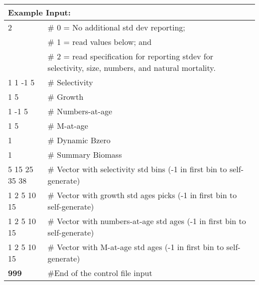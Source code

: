 \begin{longtable}{p{1.1cm} p{1.4cm} p{1.2cm} p{1.2cm} p{1.3cm} p{1.6cm} p{1.4cm} p{1.4cm} p{1.4cm}}
	
	\hline
	\multicolumn{9}{l}{Example Input:} \Tstrut\Bstrut\\
	\hline
	
	\multicolumn{3}{l}{2} & \multicolumn{6}{l}{\# 0 = No additional std dev reporting;} \Tstrut\\
	\multicolumn{3}{l}{ } & \multicolumn{6}{l}{\# 1 = read values below; and} \Bstrut\\
	\multicolumn{3}{l}{ } & \multicolumn{6}{l}{\# 2 = read specification for reporting stdev for selectivity, size, numbers, and natural mortality.} \Bstrut\\
	\hline
	
	\multicolumn{4}{l}{1 1 -1 5}  & \multicolumn{5}{l}{\# Selectivity} \Bstrut\\
	\multicolumn{4}{l}{1 5}       & \multicolumn{5}{l}{\# Growth} \Bstrut\\
	\multicolumn{4}{l}{1 -1 5}    & \multicolumn{5}{l}{\# Numbers-at-age} \Bstrut\\
	\multicolumn{4}{l}{1 5}       & \multicolumn{5}{l}{\# M-at-age} \Bstrut\\
	\multicolumn{4}{l}{1}         & \multicolumn{5}{l}{\# Dynamic Bzero} \Bstrut\\
	\multicolumn{4}{l}{1}         & \multicolumn{5}{l}{\# Summary Biomass} \Bstrut\\
	
	\multicolumn{4}{l}{5 15 25 35 38} & \multicolumn{5}{l}{\# Vector with selectivity std bins (-1 in first bin to self-generate)} \Bstrut\\
	\multicolumn{4}{l}{1 2 5 10 15}  & \multicolumn{5}{l}{\# Vector with growth std ages picks (-1 in first bin to self-generate)} \Bstrut\\
	\multicolumn{4}{l}{1 2 5 10 15}  & \multicolumn{5}{l}{\# Vector with numbers-at-age std ages (-1 in first bin to self-generate)} \Bstrut\\
	\multicolumn{4}{l}{1 2 5 10 15}  & \multicolumn{5}{l}{\# Vector with M-at-age std ages (-1 in first bin to self-generate)} \Bstrut\\
	
	\hline
	\bfseries{999} & \multicolumn{8}{l}{\#End of the control file input} \Tstrut\Bstrut\\
	\hline			
\end{longtable}
